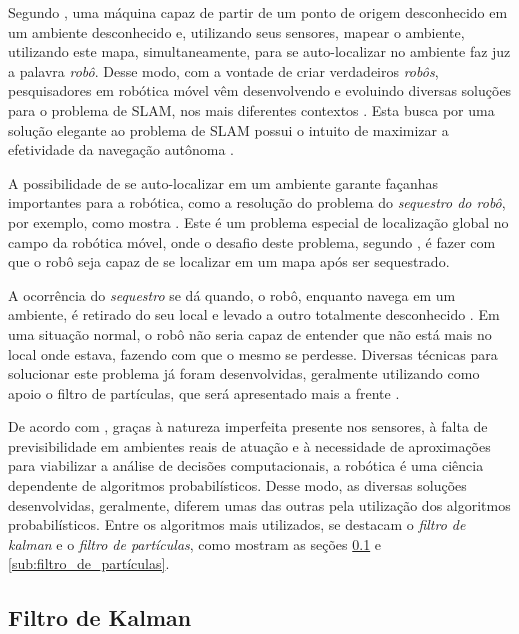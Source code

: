 Segundo \cite{slamProblem}, uma máquina capaz de partir de um ponto de origem desconhecido em um ambiente desconhecido e, utilizando seus sensores, mapear o ambiente, utilizando este mapa, simultaneamente, para se auto-localizar no ambiente faz juz a palavra \textit{robô}. Desse modo, com a vontade de criar verdadeiros \textit{robôs}, pesquisadores em robótica móvel vêm desenvolvendo e evoluindo diversas soluções para o problema de SLAM, nos mais diferentes contextos \cite{integrationVisionSLAMnonlinear}. Esta busca por uma solução elegante ao problema de SLAM possui o intuito de maximizar a efetividade da navegação autônoma \cite{theCleaningProject}. 

A possibilidade de se auto-localizar em um ambiente garante façanhas importantes para a robótica, como a resolução do problema do \textit{sequestro do robô}, por exemplo, como mostra \cite{sequestro}. Este é um problema especial de localização global no campo da robótica móvel, onde o desafio deste problema, segundo \cite{sequestroRobo}, é fazer com que o robô seja capaz de se localizar em um mapa após ser sequestrado.

A ocorrência do \textit{sequestro} se dá quando, o robô, enquanto navega em um ambiente, é retirado do seu local e levado a outro totalmente desconhecido \cite{sequestro}. Em uma situação normal, o robô não seria capaz de entender que não está mais no local onde estava, fazendo com que o mesmo se perdesse. Diversas técnicas para solucionar este problema já foram desenvolvidas, geralmente utilizando como apoio o filtro de partículas, que será apresentado mais a frente \cite{sequestroRobo}. 

De acordo com \cite{circumventingAssociationSLAM}, graças à natureza imperfeita presente nos sensores, à falta de previsibilidade em ambientes reais de atuação e à necessidade de aproximações para viabilizar a análise de decisões computacionais, a robótica é uma ciência dependente de algoritmos probabilísticos. Desse modo, as diversas soluções desenvolvidas, geralmente, diferem umas das outras pela utilização dos algoritmos probabilísticos. Entre os algoritmos mais utilizados, se destacam o \textit{filtro de kalman} e o \textit{filtro de partículas}, como mostram as seções \ref{sub:kalman} e \ref{sub:filtro_de_partículas}.

\subsection{Filtro de Kalman} %
\label{sub:kalman}

